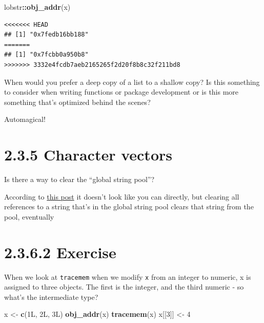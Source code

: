 \documentclass[]{book}
\newenvironment{Shaded}{\begin{snugshade}}{\end{snugshade}}
\newcommand{\DecValTok}[1]{\textcolor[rgb]{0.00,0.00,0.81}{#1}}
\newcommand{\KeywordTok}[1]{\textcolor[rgb]{0.13,0.29,0.53}{\textbf{#1}}}
\newcommand{\NormalTok}[1]{#1}
\newcommand{\OperatorTok}[1]{\textcolor[rgb]{0.81,0.36,0.00}{\textbf{#1}}}
\newcommand{\StringTok}[1]{\textcolor[rgb]{0.31,0.60,0.02}{#1}}
\begin{document}
\begin{Shaded}
\begin{Highlighting}[]
\NormalTok{lobstr}\OperatorTok{::}\KeywordTok{obj_addr}\NormalTok{(x)}
\end{Highlighting}
\end{Shaded}

\begin{verbatim}
<<<<<<< HEAD
## [1] "0x7fedb16bb188"
=======
## [1] "0x7fcbb0a950b8"
>>>>>>> 3332e4fcdb7aeb2165265f2d20f8b8c32f211bd8
\end{verbatim}

When would you prefer a deep copy of a list to a shallow copy? Is this something to consider when writing functions or package development or is this more something that's optimized behind the scenes?

Automagical!

\hypertarget{character-vectors}{%
\section*{2.3.5 Character vectors}\label{character-vectors}}

Is there a way to clear the ``global string pool''?

According to \href{https://community.rstudio.com/t/memory-usage-and-rs-global-string-pool/4762/3}{this post} it doesn't look like you can directly, but clearing all references to a string that's in the global string pool clears that string from the pool, eventually

\hypertarget{exercise}{%
\section*{2.3.6.2 Exercise}\label{exercise}}

When we look at \texttt{tracemem} when we modify \texttt{x} from an integer to numeric, x is assigned to three objects. The first is the integer, and the third numeric - so what's the intermediate type?

\begin{Shaded}
\begin{Highlighting}[]
\NormalTok{x <-}\StringTok{ }\KeywordTok{c}\NormalTok{(1L, 2L, 3L)}
\KeywordTok{obj_addr}\NormalTok{(x)}
\KeywordTok{tracemem}\NormalTok{(x)}
\NormalTok{x[[}\DecValTok{3}\NormalTok{]] <-}\StringTok{ }\DecValTok{4}
\end{Highlighting}
\end{Shaded}
\end{document}

